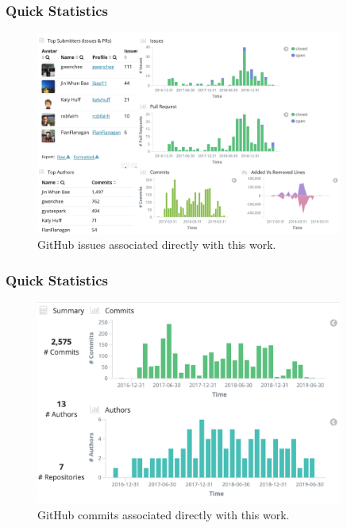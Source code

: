 \begin{frame}
        \frametitle{Quick Statistics}
    \begin{figure}[htbp!]
        \begin{center}
          \includegraphics[width=0.9\textwidth]{images/git-stats-issues-ddca.png}
        \end{center}
              \caption{GitHub issues associated directly with this work.}
      \end{figure}
\end{frame}


\begin{frame}
        \frametitle{Quick Statistics}
    \begin{figure}[htbp!]
        \begin{center}
          \includegraphics[width=0.9\textwidth]{images/git-stats-commits-ddca.png}
        \end{center}
              \caption{GitHub commits associated directly with this work.}
      \end{figure}
\end{frame}


